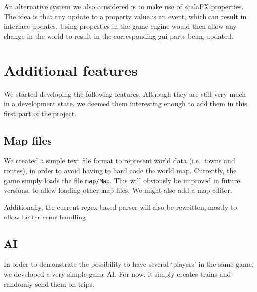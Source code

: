 \documentclass{article}
\begin{document}
An alternative system we also considered is to make use of scalaFX properties.
The idea is that any update to a property value is an event, which can result in interface updates.
Using properties in the game engine would then allow any change in the world to result in the corresponding
gui parts being updated.


\section{Additional features}
We started developing the following features. Although they are still very much in a development state,
we deemed them interesting enough to add them in this first part of the project.

\subsection{Map files}
We created a simple text file format to represent world data (i.e.\ towns and routes), 
in order to avoid having to hard code the world map.
Currently, the game simply loads the file \verb|map/Map|.
This will obviously be improved in future versions, to allow loading other map files.
We might also add a map editor.

Additionally, the current regex-based parser will also be rewritten,
mostly to allow better error handling.

\subsection{AI}
In order to demonstrate the possibility to have several `players' in the same game,
we developed a very simple game AI. For now, it simply creates trains and randomly send them on trips.
\end{document}
